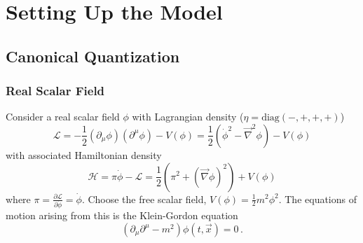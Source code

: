 \chapter{Setting Up the Model}

\section{Canonical Quantization}

\subsection{Real Scalar Field}

Consider a real scalar field $\phi$ with Lagrangian density ($\eta=\text{diag}(-,+,+,+)$)
\begin{equation}
    \mathcal{L}=-\frac{1}{2}(\partial_\mu\phi)(\partial^\mu\phi)-V(\phi)=\frac{1}{2}(\dot{\phi}^2-\vec{\nabla}^2\phi)-V(\phi)
    \label{eq:LagrangianRealScalar}
\end{equation}
with associated Hamiltonian density
\begin{equation}
    \mathcal{H}=\pi\dot{\phi}-\mathcal{L}=\frac{1}{2}(\pi^2+(\vec{\nabla}\phi)^2)+V(\phi)
\end{equation}
where $\pi=\frac{\partial\mathcal{L}}{\partial\dot{\phi}}=\dot{\phi}$. Choose the free scalar field, $V(\phi)=\frac{1}{2}m^2\phi^2$. The equations of motion arising from this is the Klein-Gordon equation
\begin{equation}
    (\partial_\mu\partial^\mu-m^2)\phi(t,\vec{x})=0\,.
    \label{eq:KGEq}
\end{equation}

